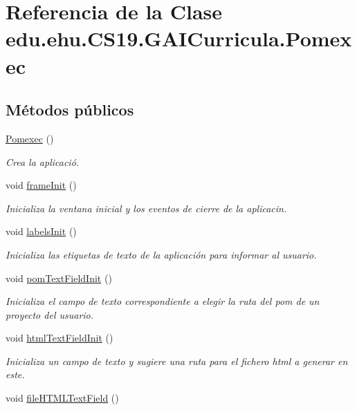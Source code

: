 \hypertarget{a00029}{}\section{Referencia de la Clase edu.\+ehu.\+C\+S19.\+G\+A\+I\+Curricula.\+Pomexec}
\label{a00029}
\subsection*{Métodos públicos}
\begin{DoxyCompactItemize}
\item 
\mbox{\hyperlink{a00029_a8de2bd06d0893d4f24ef2bd8216467cf}{Pomexec}} ()
\begin{DoxyCompactList}\small\item\em Crea la aplicació. \end{DoxyCompactList}\item 
void \mbox{\hyperlink{a00029_a1542762d65badb0de4c9e00d793acd37}{frame\+Init}} ()
\begin{DoxyCompactList}\small\item\em Inicializa la ventana inicial y los eventos de cierre de la aplicaci{\ucr}n. \end{DoxyCompactList}\item 
void \mbox{\hyperlink{a00029_ab5c03aee261eda106376a3111cadaa0a}{labels\+Init}} ()
\begin{DoxyCompactList}\small\item\em Inicializa las etiquetas de texto de la aplicación para informar al usuario. \end{DoxyCompactList}\item 
void \mbox{\hyperlink{a00029_a99d8b8d9e55a300b5ce6f7cc7d546a26}{pom\+Text\+Field\+Init}} ()
\begin{DoxyCompactList}\small\item\em Inicializa el campo de texto correspondiente a elegir la ruta del pom de un proyecto del usuario. \end{DoxyCompactList}\item 
void \mbox{\hyperlink{a00029_aac5d95af4efdb3dc20e305283cedef95}{html\+Text\+Field\+Init}} ()
\begin{DoxyCompactList}\small\item\em Inicializa un campo de texto y sugiere una ruta para el fichero html a generar en este. \end{DoxyCompactList}\item 
void \mbox{\hyperlink{a00029_aea79b02cfc8fae015e78943e32710210}{file\+H\+T\+M\+L\+Text\+Field}} ()

\end{DoxyCompactItemize}
